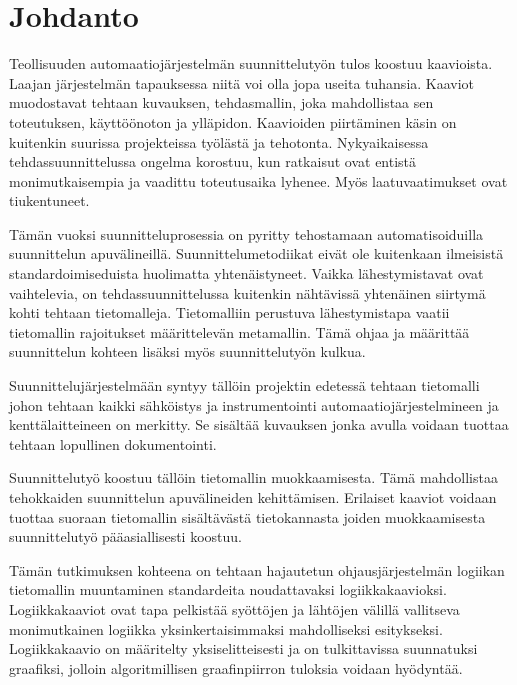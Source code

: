 \documentclass[finnish,12pt]{article}
\begin{document}
	\cleardoublepage
	\storeinipagenumber
	\setcounter{page}{1}

	\section{Johdanto}
	\thispagestyle{empty}

Teollisuuden automaatiojärjestelmän suunnittelutyön tulos koostuu kaavioista. Laajan järjestelmän tapauksessa niitä voi olla jopa useita tuhansia. Kaaviot muodostavat tehtaan kuvauksen, tehdasmallin, joka mahdollistaa sen toteutuksen, käyttöönoton ja ylläpidon. Kaavioiden piirtäminen käsin on kuitenkin suurissa projekteissa työlästä ja tehotonta. Nykyaikaisessa tehdassuunnittelussa ongelma korostuu, kun ratkaisut ovat entistä monimutkaisempia ja vaadittu toteutusaika lyhenee. Myös laatuvaatimukset ovat tiukentuneet.

Tämän vuoksi suunnitteluprosessia on pyritty tehostamaan automatisoiduilla suunnittelun apuvälineillä. Suunnittelumetodiikat eivät ole kuitenkaan ilmeisistä standardoimiseduista huolimatta yhtenäistyneet. Vaikka lähestymistavat ovat vaihtelevia, on tehdassuunnittelussa kuitenkin nähtävissä yhtenäinen siirtymä kohti tehtaan tietomalleja. Tietomalliin perustuva lähestymistapa vaatii tietomallin rajoitukset määrittelevän metamallin. Tämä ohjaa ja määrittää suunnittelun kohteen lisäksi myös suunnittelutyön kulkua.

Suunnittelujärjestelmään syntyy tällöin projektin edetessä tehtaan tietomalli johon tehtaan kaikki sähköistys ja instrumentointi automaatiojärjestelmineen ja kenttälaitteineen on merkitty. Se sisältää kuvauksen jonka avulla voidaan tuottaa tehtaan lopullinen dokumentointi.

Suunnittelutyö koostuu tällöin tietomallin muokkaamisesta. Tämä mahdollistaa tehokkaiden suunnittelun apuvälineiden kehittämisen. Erilaiset kaaviot voidaan tuottaa suoraan tietomallin sisältävästä tietokannasta joiden muokkaamisesta suunnittelutyö pääasiallisesti koostuu.

Tämän tutkimuksen kohteena on tehtaan hajautetun ohjausjärjestelmän logiikan tietomallin muuntaminen standardeita noudattavaksi logiikkakaavioksi. Logiikkakaaviot ovat tapa pelkistää syöttöjen ja lähtöjen välillä vallitseva monimutkainen logiikka yksinkertaisimmaksi mahdolliseksi esitykseksi. Logiikkakaavio on määritelty yksiselitteisesti ja on tulkittavissa suunnatuksi graafiksi, jolloin algoritmillisen graafinpiirron tuloksia voidaan hyödyntää.
\end{document}
